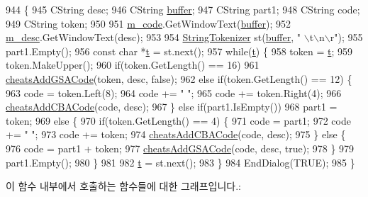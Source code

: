 \begin{DoxyCode}
944 \{
945   CString desc;
946   CString \mbox{\hyperlink{_g_b_a_8cpp_a28d4d3d8445e73a696b2d6f7eadabd96}{buffer}};
947   CString part1;
948   CString code;
949   CString token;  
950 
951   \mbox{\hyperlink{class_add_g_s_a_code_a0a4c3486121bd6be93e8f64215fea1ab}{m\_code}}.GetWindowText(\mbox{\hyperlink{_g_b_a_8cpp_a28d4d3d8445e73a696b2d6f7eadabd96}{buffer}});
952   \mbox{\hyperlink{class_add_g_s_a_code_a766cb9061a235616a856d3c1b16879db}{m\_desc}}.GetWindowText(desc);
953   
954   \mbox{\hyperlink{class_string_tokenizer}{StringTokenizer}} st(\mbox{\hyperlink{_g_b_a_8cpp_a28d4d3d8445e73a696b2d6f7eadabd96}{buffer}}, \textcolor{stringliteral}{" \(\backslash\)t\(\backslash\)n\(\backslash\)r"});
955   part1.Empty();
956   \textcolor{keyword}{const} \textcolor{keywordtype}{char} *\mbox{\hyperlink{expr_8cpp_aded116371789db1fd63c90ef00c95a3d}{t}} = st.next();
957   \textcolor{keywordflow}{while}(\mbox{\hyperlink{expr_8cpp_aded116371789db1fd63c90ef00c95a3d}{t}}) \{
958     token = \mbox{\hyperlink{expr_8cpp_aded116371789db1fd63c90ef00c95a3d}{t}};
959     token.MakeUpper();
960     \textcolor{keywordflow}{if}(token.GetLength() == 16)
961       \mbox{\hyperlink{_cheats_8cpp_a47aded7deffcbfa36ed55944eafb72ab}{cheatsAddGSACode}}(token, desc, \textcolor{keyword}{false});
962     \textcolor{keywordflow}{else} \textcolor{keywordflow}{if}(token.GetLength() == 12) \{
963       code = token.Left(8);
964       code += \textcolor{stringliteral}{" "};
965       code += token.Right(4);
966       \mbox{\hyperlink{_cheats_8cpp_af79d349aaea63793beec4fa2626f74c8}{cheatsAddCBACode}}(code, desc);
967     \} \textcolor{keywordflow}{else} \textcolor{keywordflow}{if}(part1.IsEmpty())
968       part1 = token;
969     \textcolor{keywordflow}{else} \{
970       \textcolor{keywordflow}{if}(token.GetLength() == 4) \{
971         code = part1;
972         code += \textcolor{stringliteral}{" "};
973         code += token;
974         \mbox{\hyperlink{_cheats_8cpp_af79d349aaea63793beec4fa2626f74c8}{cheatsAddCBACode}}(code, desc);
975       \} \textcolor{keywordflow}{else} \{
976         code = part1 + token;
977         \mbox{\hyperlink{_cheats_8cpp_a47aded7deffcbfa36ed55944eafb72ab}{cheatsAddGSACode}}(code, desc, \textcolor{keyword}{true});
978       \}
979       part1.Empty();
980     \}
981 
982     \mbox{\hyperlink{expr_8cpp_aded116371789db1fd63c90ef00c95a3d}{t}} = st.next();
983   \}
984   EndDialog(TRUE);
985 \}
\end{DoxyCode}
이 함수 내부에서 호출하는 함수들에 대한 그래프입니다.\+:
\nopagebreak
